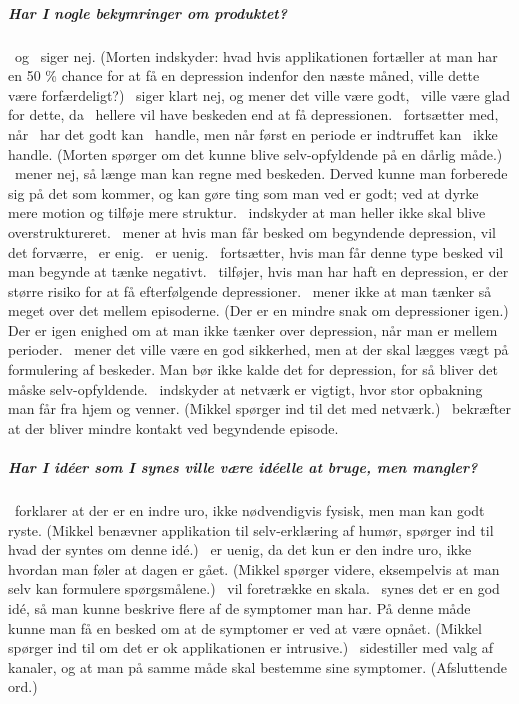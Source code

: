 \subparagraph{Har I nogle bekymringer om produktet?}
\pa~og \pe~siger nej.
(Morten indskyder: hvad hvis applikationen fortæller at man har en 50 \% chance for at få en depression indenfor den næste måned, ville dette være forfærdeligt?)
\pa~siger klart nej, og mener det ville være godt, \pa~ville være glad for dette, da \pa~hellere vil have beskeden end at få depressionen.
\pa~fortsætter med, når \pa~har det godt kan \pa~handle, men når først en periode er indtruffet kan \pa~ikke handle.
(Morten spørger om det kunne blive selv-opfyldende på en dårlig måde.)
\pe~mener nej, så længe man kan regne med beskeden.
Derved kunne man forberede sig på det som kommer, og kan gøre ting som man ved er godt; ved at dyrke mere motion og tilføje mere struktur.
\pa~indskyder at man heller ikke skal blive overstruktureret.
\pe~mener at hvis man får besked om begyndende depression, vil det forværre, \pd~er enig.
\pa~er uenig.
\pd~fortsætter, hvis man får denne type besked vil man begynde at tænke negativt.
\pe~tilføjer, hvis man har haft en depression, er der større risiko for at få efterfølgende depressioner.
\pe~mener ikke at man tænker så meget over det mellem episoderne.
(Der er en mindre snak om depressioner igen.)
Der er igen enighed om at man ikke tænker over depression, når man er mellem perioder.
\pa~mener det ville være en god sikkerhed, men at der skal lægges vægt på formulering af beskeder.
Man bør ikke kalde det for depression, for så bliver det måske selv-opfyldende.
\pd~indskyder at netværk er vigtigt, hvor stor opbakning man får fra hjem og venner.
(Mikkel spørger ind til det med netværk.)
\pd~bekræfter at der bliver mindre kontakt ved begyndende episode.

\subparagraph{Har I idéer som I synes ville være idéelle at bruge, men mangler?}
\pa~forklarer at der er en indre uro, ikke nødvendigvis fysisk, men man kan godt ryste.
(Mikkel benævner applikation til selv-erklæring af humør, spørger ind til hvad der syntes om denne idé.)
\pa~er uenig, da det kun er den indre uro, ikke hvordan man føler at dagen er gået.
(Mikkel spørger videre, eksempelvis at man selv kan formulere spørgsmålene.)
\pa~vil foretrække en skala.
\pa~synes det er en god idé, så man kunne beskrive flere af de symptomer man har.
På denne måde kunne man få en besked om at de symptomer er ved at være opnået.
(Mikkel spørger ind til om det er ok applikationen er intrusive.)
\pa~sidestiller med valg af kanaler, og at man på samme måde skal bestemme sine symptomer.
(Afsluttende ord.)
